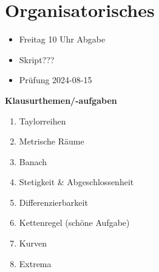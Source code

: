 \section*{Organisatorisches}
\begin{itemize}
	\item Freitag 10 Uhr Abgabe
	\item Skript???
	\item Prüfung 2024-08-15
\end{itemize}

\textbf{Klausurthemen/-aufgaben}
\begin{enumerate}[label=(\arabic*)]
	\item Taylorreihen
	\item Metrische Räume
	\item Banach
	\item Stetigkeit \& Abgeschlossenheit
	\item Differenzierbarkeit
	\item Kettenregel (schöne Aufgabe)
	\item Kurven
	\item Extrema
\end{enumerate}


